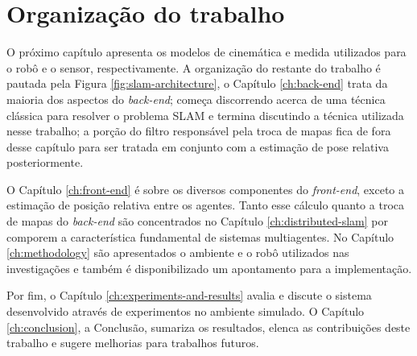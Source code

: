 \section{Organização do trabalho}
O próximo capítulo apresenta os 
modelos de cinemática e medida utilizados para o robô e o sensor, respectivamente. A organização do restante do 
trabalho é pautada pela Figura \ref{fig:slam-architecture}, o Capítulo 
\ref{ch:back-end} trata da maioria dos aspectos do \textit{back-end}; começa discorrendo acerca de uma técnica clássica para resolver o problema SLAM e termina discutindo a técnica utilizada nesse trabalho; a porção do filtro responsável pela troca de mapas fica de fora desse capítulo para ser 
tratada em conjunto com a estimação de pose relativa posteriormente.

O Capítulo \ref{ch:front-end} é sobre os diversos componentes do \textit{front-end}, exceto 
a estimação de posição relativa entre os agentes. Tanto esse cálculo 
quanto a troca de mapas do \textit{back-end} são concentrados no 
Capítulo \ref{ch:distributed-slam} por comporem a característica fundamental de 
sistemas multiagentes. No Capítulo \ref{ch:methodology} são apresentados 
o ambiente e o robô utilizados nas investigações e também é 
disponibilizado um apontamento para a implementação.

Por fim, o Capítulo \ref{ch:experiments-and-results} avalia e discute o sistema desenvolvido através de 
experimentos no ambiente simulado. O Capítulo \ref{ch:conclusion}, a Conclusão, sumariza 
os resultados, elenca as contribuições deste trabalho e sugere melhorias para trabalhos futuros.